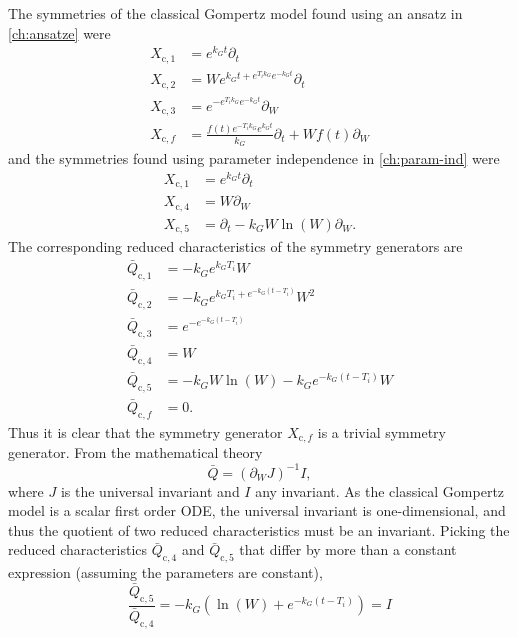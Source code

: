 The symmetries of the classical Gompertz model found using an ansatz in \cref{ch:ansatze} were
\begin{align}
  X_{\text{c},1} &= e^{k_{G} t} \partial_t \\
  X_{\text{c},2} &= W e^{k_{G} t + e^{T_{i} k_{G}} e^{- k_{G} t}} \partial_t \\
  X_{\text{c},3} &= e^{- e^{T_{i} k_{G}} e^{- k_{G} t}} \partial_W \\
  X_{\text{c},f} &= \frac{f{\left(t \right)} e^{- T_{i} k_{G}} e^{k_{G} t}}{k_{G}} \partial_t + W f{\left(t \right)} \partial_W
\end{align}
and the symmetries found using parameter independence in \cref{ch:param-ind} were
\begin{align}
  X_{\text{c},1} &= e^{k_G t} \partial_t \\
  X_{\text{c},4} &= W \partial_W \\
  X_{\text{c},5} &= \partial_t - k_G W \ln(W) \partial_W.
\end{align}
The corresponding reduced characteristics of the symmetry generators are
\begin{align}
  \bar{Q}_{\text{c},1} &= -k_G e^{k_G T_i} W \\
  \bar{Q}_{\text{c},2} &= - k_G e^{k_{G} T_i + e^{-k_G (t - T_i)}} W^2 \\
  \bar{Q}_{\text{c},3} &= e^{- e^{- k_{G} \left(t - T_{i}\right)}} \\
  \bar{Q}_{\text{c},4} &= W \\
  \bar{Q}_{\text{c},5} &= - k_G W \ln(W) - k_G e^{-k_G (t - T_i)} W \\
  \bar{Q}_{\text{c},f} &= 0.
\end{align}
Thus it is clear that the symmetry generator \(X_{\text{c},f}\) is a trivial symmetry generator.
From the mathematical theory
\begin{equation}
  \bar{Q} = (\partial_W J)^{-1} I,
\end{equation}
where \(J\) is the universal invariant and \(I\) any invariant.
As the classical Gompertz model is a scalar first order ODE, the universal invariant is one-dimensional, and thus the quotient of two reduced characteristics must be an invariant.
Picking the reduced characteristics \(\bar{Q}_{\text{c},4}\) and \(\bar{Q}_{\text{c},5}\) that differ by more than a constant expression (assuming the parameters are constant),
\begin{equation}
  \frac{\bar{Q}_{\text{c},5}}{\bar{Q}_{\text{c},4}} = - k_G \left(\ln(W) + e^{-k_G (t - T_i)} \right) = I
\end{equation}
